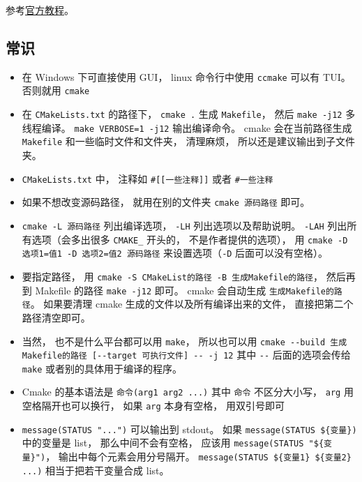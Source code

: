 
\begin{issues}
\issueDraft
\end{issues}


参考\href{https://cmake.org/cmake/help/latest/guide/tutorial/index.html}{官方教程}。

\subsection{常识}
\begin{itemize}
\item 在 Windows 下可直接使用 GUI， linux 命令行中使用 \verb`ccmake` 可以有 TUI。 否则就用 \verb`cmake`
\item 在 \verb|CMakeLists.txt| 的路径下， \verb`cmake .` 生成 \verb|Makefile|， 然后 \verb|make -j12| 多线程编译。 \verb|make VERBOSE=1 -j12| 输出编译命令。 cmake 会在当前路径生成 \verb|Makefile| 和一些临时文件和文件夹， 清理麻烦， 所以还是建议输出到子文件夹。
\item \verb|CMakeLists.txt| 中， 注释如 \verb|#[[一些注释]]| 或者 \verb|#一些注释|
\item 如果不想改变源码路径， 就用在别的文件夹 \verb|cmake 源码路径| 即可。
\item \verb|cmake -L 源码路径| 列出编译选项， \verb|-LH| 列出选项以及帮助说明。 \verb|-LAH| 列出所有选项（会多出很多 \verb|CMAKE_| 开头的， 不是作者提供的选项）， 用 \verb|cmake -D 选项1=值1 -D 选项2=值2 源码路径| 来设置选项（\verb|-D| 后面可以没有空格）。
\item 要指定路径， 用 \verb|cmake -S CMakeList的路径 -B 生成Makefile的路径|， 然后再到 Makefile 的路径 \verb|make -j12| 即可。 cmake 会自动生成 \verb|生成Makefile的路径|。 如果要清理 cmake 生成的文件以及所有编译出来的文件， 直接把第二个路径清空即可。
\item 当然， 也不是什么平台都可以用 \verb|make|， 所以也可以用 \verb|cmake --build 生成Makefile的路径 [--target 可执行文件] -- -j 12| 其中 \verb|--| 后面的选项会传给 \verb|make| 或者别的具体用于编译的程序。
\item Cmake 的基本语法是 \verb`命令(arg1 arg2 ...)` 其中 \verb|命令| 不区分大小写， \verb`arg` 用空格隔开也可以换行， 如果 \verb|arg| 本身有空格， 用双引号即可
\item \verb`message(STATUS "...")` 可以输出到 stdout。 如果 \verb`message(STATUS ${变量})` 中的变量是 list， 那么中间不会有空格， 应该用 \verb`message(STATUS "${变量}")`， 输出中每个元素会用分号隔开。 \verb`message(STATUS ${变量1} ${变量2} ...)` 相当于把若干变量合成 list。

\end{itemize}
